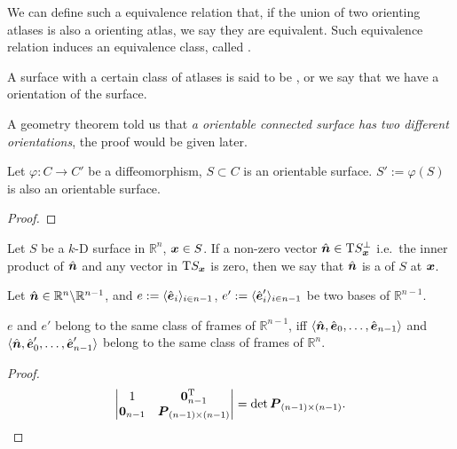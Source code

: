 \documentclass[openany]{book}
\begin{document}
\begin{definition}
	We can define such a equivalence relation that, if the union of two orienting atlases is also a orienting atlas, we say they are equivalent.
	Such equivalence relation induces an equivalence class, called .

	A surface with a certain class of atlases is said to be , or we say that we have a orientation of the surface.
\end{definition}

A geometry theorem told us that \emph{a orientable connected surface has two different orientations}, the proof would be given later.

\begin{theorem}
	Let $\varphi \colon C \to C'$ be a diffeomorphism, $S \subset C$ is an orientable surface. 
	$S' := \varphi(S)$ is also an orientable surface.
\end{theorem}
\begin{proof}
\end{proof}

\begin{definition}
	Let $S$ be a $k$-D surface in $\mathbb R^n$, $\boldsymbol{x} \in S$. 
	If a non-zero vector $\hat{\boldsymbol{n}} \in \mathrm TS_{\boldsymbol{x}}^{\bot}$ i.e.\ the inner product of $\hat{\boldsymbol{n}}$ and any vector in $\mathrm TS_{\boldsymbol{x}}$ is zero, then we say that $\hat{\boldsymbol{n}}$ is a  of $S$ at $\boldsymbol{x}$.
\end{definition}

\begin{lemma}
	Let $\hat{\boldsymbol{n}} \in \mathbb R^n \backslash \mathbb R^{n-1}$, and $e := \langle \hat{\boldsymbol{e}}_i \rangle_{i \in n - 1}$, $e' := \langle \hat{\boldsymbol{e}}'_i \rangle_{i \in n - 1}$ be two bases of $\mathbb R^{n-1}$.

	$e$ and $e'$ belong to the same class of frames of $\mathbb R^{n-1}$, iff $\langle\hat{\boldsymbol{n}}, \hat{\boldsymbol{e}}_0, \ldots, \hat{\boldsymbol{e}}_{n-1}\rangle$ and $\langle\hat{\boldsymbol{n}}, \hat{\boldsymbol{e}}'_0, \ldots, \hat{\boldsymbol{e}}'_{n-1}\rangle$ belong to the same class of frames of $\mathbb R^n$. 
\end{lemma}
\begin{proof}
	\begin{equation*}
		\begin{vmatrix}
			1 & \boldsymbol{0}_{n-1}^{\mathrm T} \\
			\boldsymbol{0}_{n-1} & \boldsymbol{P}_{(n-1)\times (n-1)}
		\end{vmatrix}
		= \det \boldsymbol{P}_{(n-1)\times (n-1)}.
	\end{equation*}
\end{proof}
\end{document}
